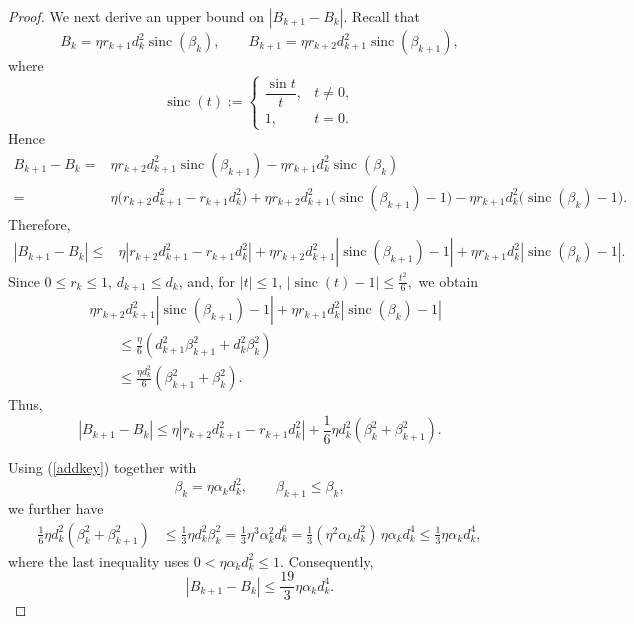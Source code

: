 \documentclass[11pt]{article}
\DeclareMathOperator{\sinc}{sinc}
\numberwithin{equation}{section}
\begin{document}
\begin{proof}
We next derive an upper bound on $|B_{k+1}-B_k|$. Recall that
\[
B_k=\eta r_{k+1}d_k^2\sinc(\beta_k),
\qquad
B_{k+1}=\eta r_{k+2}d_{k+1}^2\sinc(\beta_{k+1}),
\]
where
\[
\sinc(t):=
\begin{cases}
\dfrac{\sin t}{t}, & t\neq 0,\\[1mm]
1, & t=0.
\end{cases}
\]
Hence
\begin{align*}
B_{k+1}-B_k
={}&
\eta r_{k+2}d_{k+1}^2\sinc(\beta_{k+1})
-\eta r_{k+1}d_k^2\sinc(\beta_k)\\
={}&
\eta\bigl(r_{k+2}d_{k+1}^2-r_{k+1}d_k^2\bigr)
+\eta r_{k+2}d_{k+1}^2
   \bigl(\sinc(\beta_{k+1})-1\bigr)
-\eta r_{k+1}d_k^2
   \bigl(\sinc(\beta_k)-1\bigr).
\end{align*}
Therefore,
\begin{align*}
|B_{k+1}-B_k|
\le{}&
\eta\left|r_{k+2}d_{k+1}^2-r_{k+1}d_k^2\right|+
\eta r_{k+2}d_{k+1}^2
\left|\sinc(\beta_{k+1})-1\right|+
\eta r_{k+1}d_k^2
\left|\sinc(\beta_k)-1\right|.
\end{align*}
Since \(0\le r_k\le 1\), \(d_{k+1}\le d_k\), and, for \(|t|\le 1\),
$
|\sinc(t)-1|\le \frac{t^2}{6},
$
we obtain
\begin{align*}
&\eta r_{k+2}d_{k+1}^2
\left|\sinc(\beta_{k+1})-1\right|
+
\eta r_{k+1}d_k^2
\left|\sinc(\beta_k)-1\right|\\
&\qquad\le
\frac{\eta}{6}
\left(
d_{k+1}^2\beta_{k+1}^2+d_k^2\beta_k^2
\right)\\
&\qquad\le
\frac{\eta d_k^2}{6}
\left(
\beta_{k+1}^2+\beta_k^2
\right).
\end{align*}
Thus,
\[
|B_{k+1}-B_k|
\le
\eta\left|r_{k+2}d_{k+1}^2-r_{k+1}d_k^2\right|
+
\frac{1}{6}\eta d_k^2
\left(\beta_k^2+\beta_{k+1}^2\right).
\]

Using (\ref{addkey})
together with
\[
\beta_k=\eta\alpha_kd_k^2,
\qquad
\beta_{k+1}\le\beta_k,
\]
we further have
\begin{align*}
\frac{1}{6}\eta d_k^2(\beta_k^2+\beta_{k+1}^2)
&\le
\frac{1}{3}\eta d_k^2\beta_k^2=
\frac{1}{3}\eta^3\alpha_k^2d_k^6=
\frac{1}{3}(\eta^2\alpha_kd_k^2)\,
\eta\alpha_kd_k^4\le
\frac{1}{3}\eta\alpha_kd_k^4,
\end{align*}
where the last inequality uses
\(0<\eta\alpha_kd_k^2\le1\). Consequently,
\[
|B_{k+1}-B_k|
\le
\frac{19}{3}\eta\alpha_kd_k^4.
\]




\end{proof}
\end{document}

